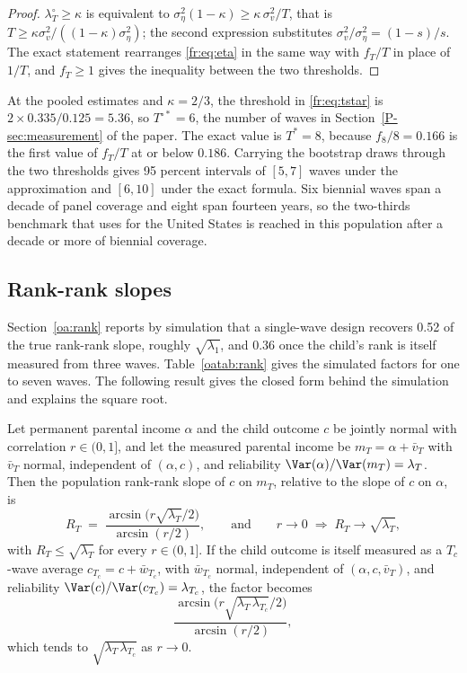 \begin{proof}
$\lambda^{\circ}_T \ge \kappa$ is equivalent to
$\sigma^2_\eta(1-\kappa) \ge \kappa\,\sigma^2_v/T$, that is
$T \ge \kappa\sigma^2_v/((1-\kappa)\sigma^2_\eta)$; the second expression
substitutes $\sigma^2_v/\sigma^2_\eta = (1-s)/s$. The exact statement
rearranges \eqref{fr:eq:eta} in the same way with $f_T/T$ in place of
$1/T$, and $f_T \ge 1$ gives the inequality between the two thresholds.
\end{proof}

At the pooled estimates and $\kappa = 2/3$, the threshold in
\eqref{fr:eq:tstar} is $2 \times 0.335/0.125 = 5.36$, so
$T^{\circ *} = 6$, the number of waves in Section~\ref{P-sec:measurement}
of the paper. The exact value is $T^* = 8$, because $f_8/8 = 0.166$ is the
first value of $f_T/T$ at or below $0.186$. Carrying the bootstrap draws
through the two thresholds gives 95 percent intervals of $[5, 7]$ waves
under the approximation and $[6, 10]$ under the exact formula. Six biennial waves span a decade of panel coverage and eight span fourteen years, so the two-thirds benchmark that \citet{Mazumder2005} uses for the United States is reached in this population after a decade or more of biennial coverage.

\subsection{Rank-rank slopes}

Section~\ref{oa:rank} reports by simulation that a single-wave design recovers 0.52 of the true rank-rank slope, roughly
$\sqrt{\lambda_1}$, and 0.36 once the child's rank is itself measured from
three waves. Table~\ref{oatab:rank} gives the simulated
factors for one to seven waves. The following result gives the closed
form behind the simulation and explains the square root.

\begin{proposition}
\label{fr:prop:rank}
Let permanent parental income $\alpha$ and the child outcome $c$ be
jointly normal with correlation $r \in (0,1]$, and let the measured
parental income be $m_T = \alpha + \bar v_T$ with $\bar v_T$ normal,
independent of $(\alpha, c)$, and reliability
$\Var(\alpha)/\Var(m_T) = \lambda_T$. Then the population rank-rank slope of
$c$ on $m_T$, relative to the slope of $c$ on $\alpha$, is
\begin{equation}
R_T \;=\; \frac{\arcsin\!\big(r\sqrt{\lambda_T}/2\big)}{\arcsin(r/2)},
\qquad \text{and} \qquad r\to 0 \;\Rightarrow\; R_T \to \sqrt{\lambda_T},
\label{fr:eq:rank}
\end{equation}
with $R_T \le \sqrt{\lambda_T}$ for every $r \in (0,1]$. If the child outcome
is itself measured as a $T_c$-wave average $c_{T_c} = c + \bar w_{T_c}$,
with $\bar w_{T_c}$ normal, independent of $(\alpha, c, \bar v_T)$, and
reliability $\Var(c)/\Var(c_{T_c}) = \lambda_{T_c}$, the factor becomes
\[
\frac{\arcsin\!\big(r\sqrt{\lambda_T\,\lambda_{T_c}}/2\big)}{\arcsin(r/2)},
\]
which tends to $\sqrt{\lambda_T\,\lambda_{T_c}}$ as $r \to 0$.
\end{proposition}

